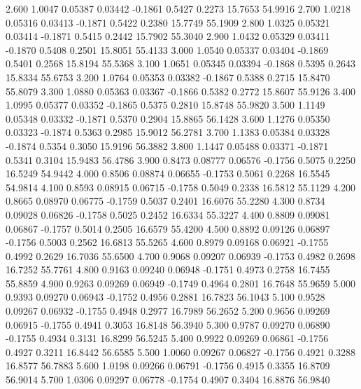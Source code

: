    2.600   1.0047   0.05387   0.03442  -0.1861   0.5427   0.2273  15.7653  54.9916
   2.700   1.0218   0.05316   0.03413  -0.1871   0.5422   0.2380  15.7749  55.1909
   2.800   1.0325   0.05321   0.03414  -0.1871   0.5415   0.2442  15.7902  55.3040
   2.900   1.0432   0.05329   0.03411  -0.1870   0.5408   0.2501  15.8051  55.4133
   3.000   1.0540   0.05337   0.03404  -0.1869   0.5401   0.2568  15.8194  55.5368
   3.100   1.0651   0.05345   0.03394  -0.1868   0.5395   0.2643  15.8334  55.6753
   3.200   1.0764   0.05353   0.03382  -0.1867   0.5388   0.2715  15.8470  55.8079
   3.300   1.0880   0.05363   0.03367  -0.1866   0.5382   0.2772  15.8607  55.9126
   3.400   1.0995   0.05377   0.03352  -0.1865   0.5375   0.2810  15.8748  55.9820
   3.500   1.1149   0.05348   0.03332  -0.1871   0.5370   0.2904  15.8865  56.1428
   3.600   1.1276   0.05350   0.03323  -0.1874   0.5363   0.2985  15.9012  56.2781
   3.700   1.1383   0.05384   0.03328  -0.1874   0.5354   0.3050  15.9196  56.3882
   3.800   1.1447   0.05488   0.03371  -0.1871   0.5341   0.3104  15.9483  56.4786
   3.900   0.8473   0.08777   0.06576  -0.1756   0.5075   0.2250  16.5249  54.9442
   4.000   0.8506   0.08874   0.06655  -0.1753   0.5061   0.2268  16.5545  54.9814
   4.100   0.8593   0.08915   0.06715  -0.1758   0.5049   0.2338  16.5812  55.1129
   4.200   0.8665   0.08970   0.06775  -0.1759   0.5037   0.2401  16.6076  55.2280
   4.300   0.8734   0.09028   0.06826  -0.1758   0.5025   0.2452  16.6334  55.3227
   4.400   0.8809   0.09081   0.06867  -0.1757   0.5014   0.2505  16.6579  55.4200
   4.500   0.8892   0.09126   0.06897  -0.1756   0.5003   0.2562  16.6813  55.5265
   4.600   0.8979   0.09168   0.06921  -0.1755   0.4992   0.2629  16.7036  55.6500
   4.700   0.9068   0.09207   0.06939  -0.1753   0.4982   0.2698  16.7252  55.7761
   4.800   0.9163   0.09240   0.06948  -0.1751   0.4973   0.2758  16.7455  55.8859
   4.900   0.9263   0.09269   0.06949  -0.1749   0.4964   0.2801  16.7648  55.9659
   5.000   0.9393   0.09270   0.06943  -0.1752   0.4956   0.2881  16.7823  56.1043
   5.100   0.9528   0.09267   0.06932  -0.1755   0.4948   0.2977  16.7989  56.2652
   5.200   0.9656   0.09269   0.06915  -0.1755   0.4941   0.3053  16.8148  56.3940
   5.300   0.9787   0.09270   0.06890  -0.1755   0.4934   0.3131  16.8299  56.5245
   5.400   0.9922   0.09269   0.06861  -0.1756   0.4927   0.3211  16.8442  56.6585
   5.500   1.0060   0.09267   0.06827  -0.1756   0.4921   0.3288  16.8577  56.7883
   5.600   1.0198   0.09266   0.06791  -0.1756   0.4915   0.3355  16.8709  56.9014
   5.700   1.0306   0.09297   0.06778  -0.1754   0.4907   0.3404  16.8876  56.9840
